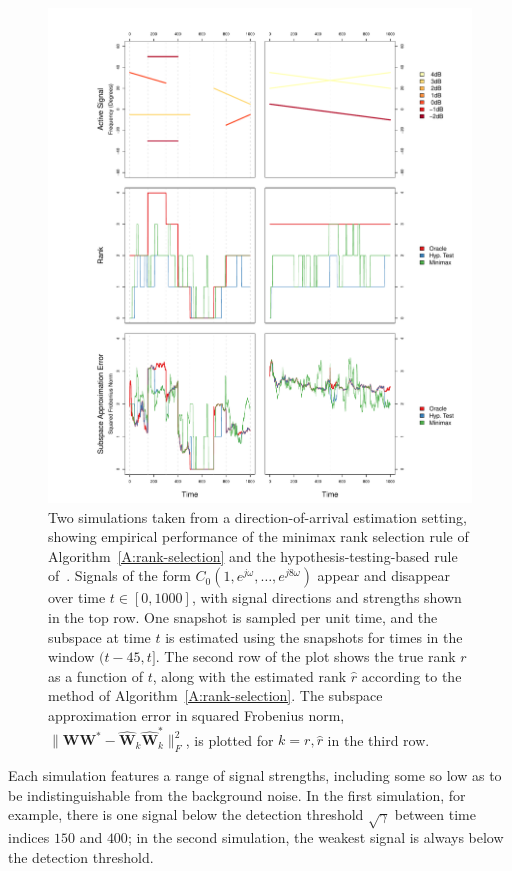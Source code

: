 \documentclass[final]{IEEEtran} %
\newcommand{\vectorsymbol}{\underline}
\newcommand{\matrixsymbol}{\boldsymbol}
\newcommand{\mW}{\matrixsymbol{W}}
\newcommand{\mhW}{\widehat{\matrixsymbol{W}}}
\newcommand{\va}{\vectorsymbol{a}}
\begin{document}
\begin{figure}
    \centering
    \includegraphics[width=2.1\columnwidth]{plots/doa-sim}
    \caption{\label{F:simulations} Two simulations taken from a direction-of-arrival estimation setting, showing empirical performance of the minimax rank selection rule of Algorithm~\ref{A:rank-selection} and the hypothesis-testing-based rule of~\cite{kritchman2008dnc}.  Signals of the form  %
    $C_0 ( 1, e^{j \omega}, \ldots, e^{j 8 \omega})$
        appear and disappear over time $t \in [0,1000]$, with signal directions and strengths shown in the top row.  One snapshot is sampled per unit time, and the subspace at time $t$ is estimated using the snapshots for times in the window $(t-45,t]$.  The second row of the plot shows the true rank $r$ as a function of $t$, along with the estimated rank $\hat r$ according to the method of Algorithm~\ref{A:rank-selection}.  The subspace approximation error in squared Frobenius norm, $\|\mW \mW^\ast - \mhW_k \mhW^\ast_k \|_F^2$, is plotted for $k = r, \hat r$ in the third row.
        }
\end{figure}

Each simulation features a range of signal strengths, including some so low as to be indistinguishable from the background noise.  In the first simulation, for example, there is one signal below the detection threshold $\sqrt{\gamma}$ between time indices $150$ and $400$; in the second simulation, the weakest signal is always below the detection threshold.
\end{document}
